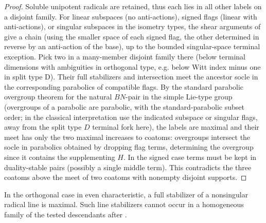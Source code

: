 \begin{proof}

Soluble unipotent radicals are retained, thus each lies in all other labels on a disjoint family. For
linear subspaces (no anti-actions), signed flags (linear with anti-actions), or singular subspaces in the
isometry types, the shear arguments of  give
a chain (using the smaller space of each signed flag, the other determined in reverse by an anti-action
of the base), up to the bounded singular-space terminal exception. Pick two in a many-member disjoint
family there (below terminal dimensions with ambiguities in orthogonal type, e.g. below Witt index minus
one in split type D). Their full stabilizers and intersection meet the ancestor socle in the
corresponding parabolics of compatible flags. By the standard parabolic overgroup theorem for the natural
\(BN\)-pair in the simple Lie-type group (overgroups of a parabolic are parabolic, with the
standard-parabolic subset order; in the classical interpretation use the indicated subspace or singular
flags, away from the split type \(D\) terminal fork here), the labels are maximal and their meet has only
the two maximal increases to coatoms: overgroups intersect the socle in parabolics obtained by dropping
flag terms, determining the overgroup since it contains the supplementing \(H\). In the signed case terms
must be kept in duality-stable pairs (possibly a single middle term). This contradicts the three coatoms
above the meet of two coatoms with nonempty disjoint supports.

\end{proof}

\begin{lemma}\label{fa:radical-lines}
In the orthogonal case in even characteristic, a full stabilizer of a nonsingular radical line is
maximal.  Such line stabilizers cannot occur in a homogeneous family of the tested descendants after
.
\end{lemma}

